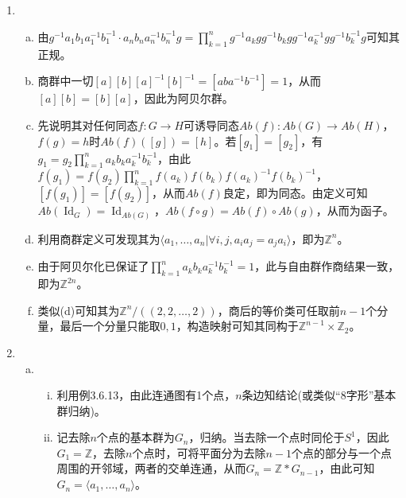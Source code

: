\documentclass[a4paper,UTF8,fontset=windows]{ctexart}
\DeclareMathOperator{\Id}{Id}
\begin{document}
\subsection{}
\begin{enumerate}[(1)]
    \item
    \begin{enumerate}[(a)]
    \item
    由$g^{-1}a_1b_1a_1^{-1}b_1^{-1}\cdot a_nb_na_n^{-1}b_n^{-1}g=\prod_{k=1}^ng^{-1}a_kgg^{-1}b_kgg^{-1}a_k^{-1}gg^{-1}b_k^{-1}g$可知其正规。
    
    \item
    商群中一切$[a][b][a]^{-1}[b]^{-1}=[aba^{-1}b^{-1}]=1$，从而$[a][b]=[b][a]$，因此为阿贝尔群。
    
    \item
    先说明其对任何同态$f:G\to H$可诱导同态$Ab(f):Ab(G)\to Ab(H)$，$f(g)=h$时$Ab(f)([g])=[h]$。若$[g_1]=[g_2]$，有$g_1=g_2\prod_{k=1}^na_kb_ka_k^{-1}b_k^{-1}$，由此$f(g_1)=f(g_2)\prod_{k=1}^nf(a_k)f(b_k)f(a_k)^{-1}f(b_k)^{-1}$，$[f(g_1)]=[f(g_2)]$，从而$Ab(f)$良定，即为同态。由定义可知$Ab(\Id_G)=\Id_{Ab(G)}$，$Ab(f\circ g)=Ab(f)\circ Ab(g)$，从而为函子。
    
    \item
    利用商群定义可发现其为$\langle a_1,\dots,a_n|\forall i,j,a_ia_j=a_ja_i\rangle$，即为$\mathbb{Z}^n$。
    
    \item
    由于阿贝尔化已保证了$\prod_{k=1}^na_kb_ka_k^{-1}b_k^{-1}=1$，此与自由群作商结果一致，即为$\mathbb{Z}^{2n}$。
    
    \item
    类似(d)可知其为$\mathbb{Z}^n/((2,2,\dots,2))$，商后的等价类可任取前$n-1$个分量，最后一个分量只能取$0,1$，构造映射可知其同构于$\mathbb{Z}^{n-1}\times\mathbb{Z}_2$。
    \end{enumerate}
    
    \item
    \begin{enumerate}[(a)]
    \item
    \begin{enumerate}[(i)]
    \item
    利用例3.6.13，由此连通图有1个点，$n$条边知结论(或类似“8字形”基本群归纳)。
    
    \item
    记去除$n$个点的基本群为$G_n$，归纳。当去除一个点时同伦于$S^1$，因此$G_1=\mathbb{Z}$，去除$n$个点时，可将平面分为去除$n-1$个点的部分与一个点周围的开邻域，两者的交单连通，从而$G_n=\mathbb{Z}*G_{n-1}$，由此可知$G_n=\langle a_1,\dots,a_n\rangle$。
    

\end{enumerate}
\end{enumerate}
\end{enumerate}
\end{document}

